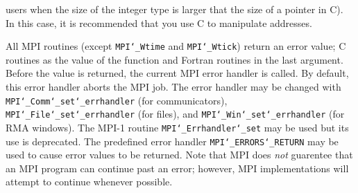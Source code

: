 users when the size of the integer type is larger that the size of a pointer
in C).  In this case, it is recommended that you use C to manipulate
addresses.
\par
{}
\par
All MPI routines (except {\tt MPI{\tt \char`\_}Wtime} and {\tt MPI{\tt \char`\_}Wtick}) return an error value;
C routines as the value of the function and Fortran routines in the last
argument.  Before the value is returned, the current MPI error handler is
called.  By default, this error handler aborts the MPI job.  The error handler
may be changed with {\tt MPI{\tt \char`\_}Comm{\tt \char`\_}set{\tt \char`\_}errhandler} (for communicators),
{\tt MPI{\tt \char`\_}File{\tt \char`\_}set{\tt \char`\_}errhandler} (for files), and {\tt MPI{\tt \char`\_}Win{\tt \char`\_}set{\tt \char`\_}errhandler} (for
RMA windows).  The MPI-1 routine {\tt MPI{\tt \char`\_}Errhandler{\tt \char`\_}set} may be used but
its use is deprecated.  The predefined error handler
{\tt MPI{\tt \char`\_}ERRORS{\tt \char`\_}RETURN} may be used to cause error values to be returned.
Note that MPI does {\em not} guarentee that an MPI program can continue past
an error; however, MPI implementations will attempt to continue whenever
possible.
\par
{}
\endmanpage
